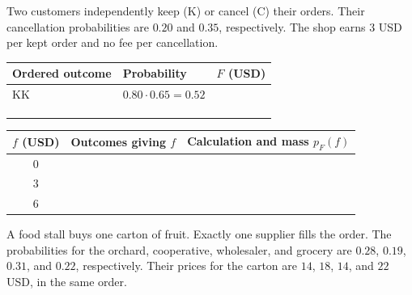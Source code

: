 Two customers independently keep (\(\mathrm{K}\)) or cancel (\(\mathrm{C}\)) their orders. Their cancellation probabilities are \(0.20\) and \(0.35\), respectively. The shop earns \(3\) USD per kept order and no fee per cancellation.

\noindent
\begin{minipage}[t]{0.48\linewidth}
	
	\begin{tabularx}{\linewidth}{|l|Y|Y|}
		\hline
		Ordered outcome & Probability & \(F\) (USD) \\ \hline
		\(\mathrm{KK}\) & \(0.80\cdot0.65=0.52\) & \\ \hline
		& & \rule{0pt}{1.7em} \\ \hline
		& & \rule{0pt}{1.7em} \\ \hline
		& & \rule{0pt}{1.7em} \\ \hline
	\end{tabularx}
\end{minipage}
\hfill
\begin{minipage}[t]{0.48\linewidth}
	
	\begin{tabularx}{\linewidth}{|c|Y|Y|}
		\hline
		\(f\) (USD) & Outcomes giving \(f\) & Calculation and mass \(p_F(f)\) \\ \hline
		\(0\) & & \rule{0pt}{1.55em} \\ \hline
		\(3\) & & \rule{0pt}{1.55em} \\ \hline
		\(6\) & & \rule{0pt}{1.55em} \\ \hline
	\end{tabularx}
\end{minipage}



\vspace{-7mm}
A food stall buys one carton of fruit. Exactly one supplier fills the order. The probabilities for the orchard, cooperative, wholesaler, and grocery are \(0.28\), \(0.19\), \(0.31\), and \(0.22\), respectively. Their prices for the carton are \(14\), \(18\), \(14\), and \(22\) USD, in the same order.

